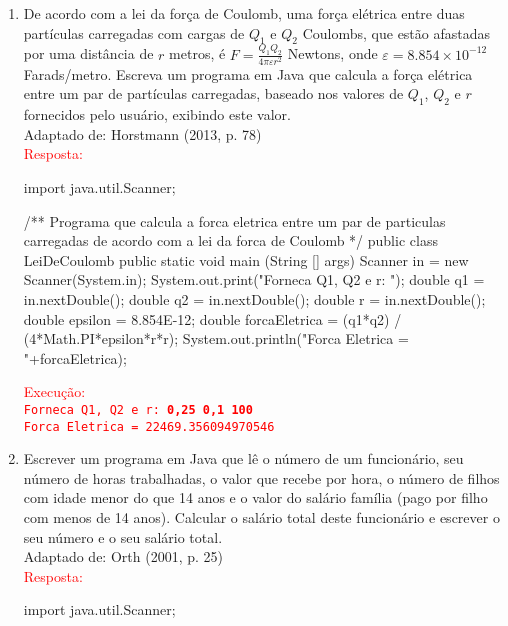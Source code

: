 \documentclass[onecolumn,a4paper,10pt]{report}
\newcommand{\+}{\, + \,}
\newcommand{\<}{\hspace*{-0.4cm}}
\begin{document}
\begin{enumerate}[1.]
\item De acordo com a lei da força de Coulomb, uma força elétrica entre duas partículas carregadas com cargas de $Q_1$ e $Q_2$ Coulombs, que estão afastadas por uma distância de $r$ metros, é $F = \frac{Q_1Q_2}{4\pi \varepsilon r^2}$ Newtons, onde $\varepsilon = 8.854 \times 10^{-12}$ Farads/metro. Escreva um programa em Java que calcula a força elétrica entre um par de partículas carregadas, baseado nos valores de $Q_1$, $Q_2$ e $r$ fornecidos pelo usuário, exibindo este valor.\\
{\tiny Adaptado de: Horstmann (2013, p. 78)}\\
\textcolor{red}{Resposta:}\\
\begin{javacode}
import java.util.Scanner;

/**
   Programa que calcula a forca eletrica entre um par de particulas
   carregadas de acordo com a lei da forca de Coulomb
*/
public class LeiDeCoulomb {
    public static void main (String [] args) {
        Scanner in = new Scanner(System.in);
        System.out.print("Forneca Q1, Q2 e r: ");
        double q1 = in.nextDouble();
        double q2 = in.nextDouble();
        double r = in.nextDouble();
        double epsilon = 8.854E-12;
        double forcaEletrica = (q1*q2) / (4*Math.PI*epsilon*r*r);
        System.out.println("Forca Eletrica = "+forcaEletrica);
    }
}
\end{javacode}
\textcolor{red}{Execução:\\
\texttt{Forneca Q1, Q2 e r: \textbf{0,25 0,1 100}\\
Forca Eletrica = 22469.356094970546
}
}

\item Escrever um programa em Java que lê o número de um funcionário, seu número de horas trabalhadas, o valor que recebe por hora, o número de filhos com idade menor do que 14 anos e o valor do salário família (pago por filho com menos de 14 anos). Calcular o salário total deste funcionário e escrever o seu número e o seu salário total.\\
{\tiny Adaptado de: Orth (2001, p. 25)}\\
\textcolor{red}{Resposta:}\\
\begin{javacode}
import java.util.Scanner;


\end{javacode}
\end{enumerate}
\end{document}
